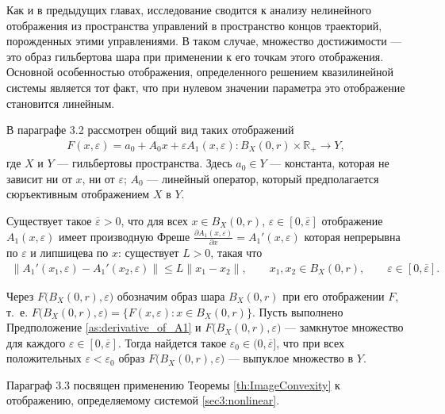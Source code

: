 \documentclass[../abstract.tex]{subfiles}
\begin{document}
Как и в предыдущих главах, исследование сводится к анализу нелинейного отображения из пространства управлений в пространство концов траекторий, порожденных этими управлениями.
В таком случае, множество достижимости --- это образ гильбертова шара при применении к его точкам этого отображения. 
Основной особенностью отображения, определенного решением квазилинейной системы является тот факт, что при нулевом значении параметра это отображение становится линейным.

В параграфе 3.2 рассмотрен общий вид таких отображений
\begin{gather*} 
	F(x, \varepsilon) = a_0 + A_0x + \varepsilon A_1(x,\varepsilon): B_X(0, r) \times \mathbb{R}_+ \rightarrow Y,
\end{gather*} 
где $X$ и $Y$ --- гильбертовы пространства.
Здесь $a_0 \in Y$ --- константа, которая не зависит ни от $x$, ни от $\varepsilon$; $A_0$ --- линейный оператор, который предполагается сюръективным отображением $X$ в $Y$. 

\begin{assumption}\label{as:derivative_of_A1}
	Существует такое $\overline{\varepsilon} > 0$, что для всех $x \in B_X(0,r)$, $\varepsilon \in [0, \overline{\varepsilon}]$ отображение $A_1(x, \varepsilon)$ имеет производную Фреше $\frac{\partial A_1(x, \varepsilon)}{\partial x} = A_1'(x, \varepsilon)$ которая непрерывна по $\varepsilon$ и липшицева по $x$: существует $L>0$, такая что
	\begin{gather*}
		\|A_1'(x_1,\varepsilon) - A_1'(x_2,\varepsilon) \| \leqslant L\|x_1-x_2\|, \qquad x_1, x_2 \in B_X(0,r), \qquad \varepsilon \in [0, \overline{\varepsilon}].
	\end{gather*}
\end{assumption}

\begin{theorem}\label{th:ImageConvexity}
	Через $F\big(B_X(0,r),\varepsilon\big)$ обозначим образ шара $B_X(0, r)$ при его отображении $F$, т.~е. $F\big(B_X(0,r),\varepsilon\big) = \big\{F(x,\varepsilon): x\in B_X(0, r)\big\}$.
	Пусть выполнено Предположение \ref{as:derivative_of_A1} и $F\big(B_X(0,r),\varepsilon\big)$ --- замкнутое множество для каждого $\varepsilon \in [0, \overline{\varepsilon}]$. 
	Тогда найдется такое $ \varepsilon_0 \in (0, \overline{\varepsilon}]$, что при всех положительных $\varepsilon < \varepsilon_0$ образ $F\big(B_X(0,r),\varepsilon\big)$ --- выпуклое множество в $Y$. 
\end{theorem}

Параграф 3.3 посвящен применению Теоремы \ref{th:ImageConvexity} к отображению, определяемому системой \eqref{sec3:nonlinear}.
\end{document}
